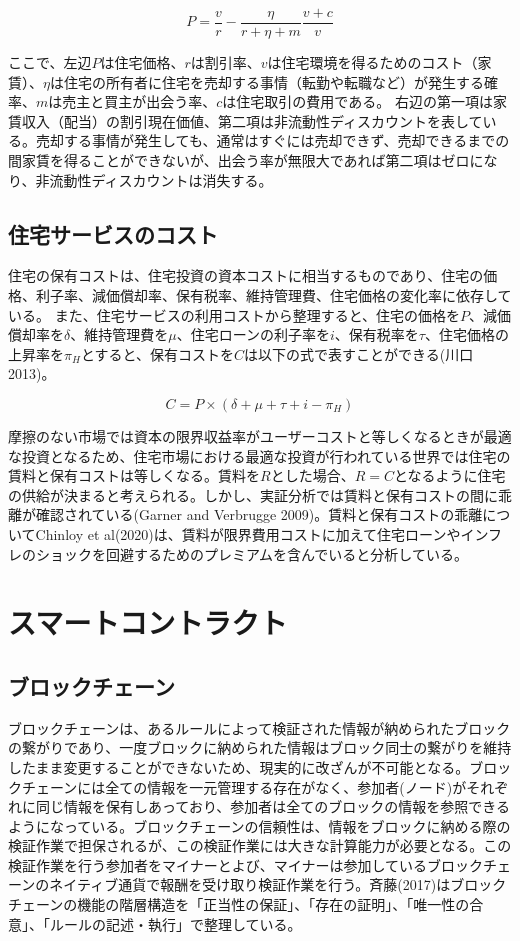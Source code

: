 \documentclass[a4paper,fontsize=11pt,report,notitlepage,line_length=38zw,number_of_lines=40,dvipdfmx]{jlreq}
\begin{document}
\begin{equation}
P=\dfrac{v}{r}-\dfrac{\eta}{r+\eta+m}\dfrac{v+c}{v}
\end{equation}

ここで、左辺$P$は住宅価格、$r$は割引率、$v$は住宅環境を得るためのコスト（家賃）、$\eta$は住宅の所有者に住宅を売却する事情（転勤や転職など）が発生する確率、$m$は売主と買主が出会う率、$c$は住宅取引の費用である。
右辺の第一項は家賃収入（配当）の割引現在価値、第二項は非流動性ディスカウントを表している。売却する事情が発生しても、通常はすぐには売却できず、売却できるまでの間家賃を得ることができないが、出会う率が無限大であれば第二項はゼロになり、非流動性ディスカウントは消失する。

\subsection{住宅サービスのコスト}
住宅の保有コストは、住宅投資の資本コストに相当するものであり、住宅の価格、利子率、減価償却率、保有税率、維持管理費、住宅価格の変化率に依存している。
また、住宅サービスの利用コストから整理すると、住宅の価格を$P$、減価償却率を$\delta$、維持管理費を$\mu$、住宅ローンの利子率を$i$、保有税率を$\tau$、住宅価格の上昇率を$\pi_H$とすると、保有コストを$C$は以下の式で表すことができる(川口 2013)\cite{kawaguchi2013}。

\begin{equation}
C=P\times(\delta+\mu+\tau+i-\pi_H)
\end{equation}

摩擦のない市場では資本の限界収益率がユーザーコストと等しくなるときが最適な投資となるため、住宅市場における最適な投資が行われている世界では住宅の賃料と保有コストは等しくなる。賃料を$R$とした場合、$R=C$となるように住宅の供給が決まると考えられる。しかし、実証分析では賃料と保有コストの間に乖離が確認されている(Garner and Verbrugge 2009)\cite{garner2009}。賃料と保有コストの乖離についてChinloy et al(2020)\cite{chinloy2020}は、賃料が限界費用コストに加えて住宅ローンやインフレのショックを回避するためのプレミアムを含んでいると分析している。

\section{スマートコントラクト}
\subsection{ブロックチェーン}
ブロックチェーンは、あるルールによって検証された情報が納められたブロックの繋がりであり、一度ブロックに納められた情報はブロック同士の繋がりを維持したまま変更することができないため、現実的に改ざんが不可能となる。ブロックチェーンには全ての情報を一元管理する存在がなく、参加者(ノード)がそれぞれに同じ情報を保有しあっており、参加者は全てのブロックの情報を参照できるようになっている。ブロックチェーンの信頼性は、情報をブロックに納める際の検証作業で担保されるが、この検証作業には大きな計算能力が必要となる。この検証作業を行う参加者をマイナーとよび、マイナーは参加しているブロックチェーンのネイティブ通貨で報酬を受け取り検証作業を行う。斉藤(2017)\cite{saito2017}はブロックチェーンの機能の階層構造を「正当性の保証」、「存在の証明」、「唯一性の合意」、「ルールの記述・執行」で整理している。
\end{document}
